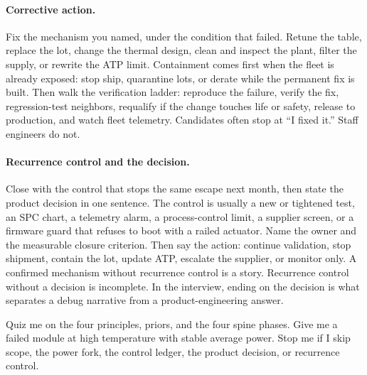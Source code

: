 \paragraph{Corrective action.}
Fix the mechanism you named, under the condition that failed. Retune the
table, replace the lot, change the thermal design, clean and inspect the
plant, filter the supply, or rewrite the ATP limit. Containment
comes first when the fleet is already exposed: stop ship, quarantine lots, or
derate while the permanent fix is built. Then walk the verification ladder:
reproduce the failure, verify the fix, regression-test neighbors, requalify if
the change touches life or safety, release to production, and watch fleet
telemetry. Candidates often stop at ``I fixed it.'' Staff engineers do not.

\paragraph{Recurrence control and the decision.}
Close with the control that stops the same escape next month, then state the
product decision in one sentence. The control is usually a new or tightened
test, an SPC chart, a telemetry alarm, a process-control limit,
a supplier screen, or a firmware guard that refuses to boot with a railed
actuator. Name the owner and the measurable closure criterion. Then say the
action: continue validation, stop shipment, contain the lot, update ATP,
escalate the supplier, or monitor only. A confirmed mechanism without recurrence control
is a story. Recurrence control without a decision is incomplete. In the
interview, ending on the decision is what separates a debug narrative from a
product-engineering answer.


{Quiz me on the four principles, priors, and the four spine phases. Give me a
failed module at high temperature with stable average power. Stop me if I skip
scope, the power fork, the control ledger, the product decision, or recurrence
control.}

